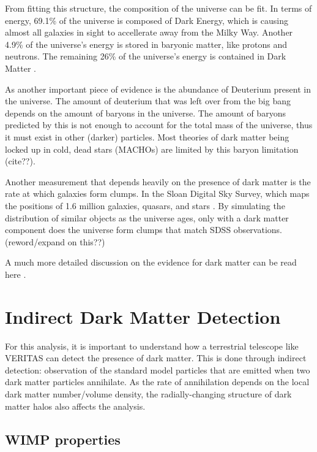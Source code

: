     From fitting this structure, the composition of the universe can be fit.
    In terms of energy, 69.1\% of the universe is composed of Dark Energy, which is causing almost all galaxies in sight to accellerate away from the Milky Way.
    Another 4.9\% of the universe's energy is stored in baryonic matter, like protons and neutrons.
    The remaining 26\% of the universe's energy is contained in Dark Matter \cite{planck2015}.

    As another important piece of evidence is the abundance of Deuterium present in the universe.
    The amount of deuterium that was left over from the big bang depends on the amount of baryons in the universe.
    The amount of baryons predicted by this is not enough to account for the total mass of the universe, thus it must exist in other (darker) particles.
    Most theories of dark matter being locked up in cold, dead stars (MACHOs) are limited by this baryon limitation {\color{red}(cite??)}.

    Another measurement that depends heavily on the presence of dark matter is the rate at which galaxies form clumps.
    In the Sloan Digital Sky Survey, which maps the positions of 1.6 million galaxies, quasars, and stars \cite{sdss_release}.
    By simulating the distribution of similar objects as the universe ages, only with a dark matter component does the universe form clumps that match SDSS observations.
    {\color{red}(reword/expand on this??)}
  
    A much more detailed discussion on the evidence for dark matter can be read here \cite{DMPrimer}.

\section{Indirect Dark Matter Detection}
  For this analysis, it is important to understand how a terrestrial telescope like VERITAS can detect the presence of dark matter.
  This is done through indirect detection: observation of the standard model particles that are emitted when two dark matter particles annihilate.
  As the rate of annihilation depends on the local dark matter number/volume density, the radially-changing structure of dark matter halos also affects the analysis.
  \subsection{WIMP properties}

